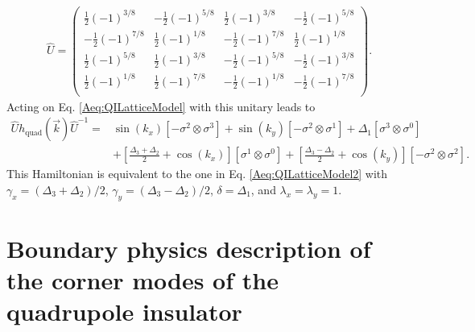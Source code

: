 \documentclass[%
 reprint,
 amsmath,amssymb,
 aps,
]{revtex4-1}
\begin{document}
\begin{appendix}
\begin{equation}\begin{split}
\hat{U} = \left(
\begin{array}{cccc}
 \frac{1}{2} (-1)^{3/8} & -\frac{1}{2} (-1)^{5/8} & \frac{1}{2} (-1)^{3/8} & -\frac{1}{2}
   (-1)^{5/8} \\
 -\frac{1}{2} (-1)^{7/8} & \frac{1}{2} (-1)^{1/8} & -\frac{1}{2} (-1)^{7/8} &
   \frac{1}{2} (-1)^{1/8} \\
 \frac{1}{2} (-1)^{5/8} & \frac{1}{2} (-1)^{3/8} & -\frac{1}{2} (-1)^{5/8} & -\frac{1}{2}
   (-1)^{3/8} \\
 \frac{1}{2} (-1)^{1/8} & \frac{1}{2} (-1)^{7/8} & -\frac{1}{2} (-1)^{1/8} & -\frac{1}{2}
   (-1)^{7/8} \\
\end{array}
\right).
\label{Aeq:UnitaryBasisChange}\end{split}\end{equation}
Acting on Eq. \ref{Aeq:QILatticeModel} with this unitary leads to 
\begin{equation}\begin{split}
\hat{U}h_{\text{quad}}(\vec{k})\hat{U}^{-1} = &\sin(k_x)[-\sigma^2 \otimes \sigma^3]  + \sin(k_y)[-\sigma^2 \otimes \sigma^1] + \Delta_1 [\sigma^3 \otimes \sigma^0]\\
&+[\frac{\Delta_3 + \Delta_2}{2} + \cos(k_x)][\sigma^1 \otimes \sigma^0] +[\frac{\Delta_3 - \Delta_2}{2} + \cos(k_y)][-\sigma^2\otimes \sigma^2].
\label{Aeq:QILatticeModelTrans}\end{split}\end{equation}
This Hamiltonian is equivalent to the one in Eq. \ref{Aeq:QILatticeModel2} with $\gamma_x = (\Delta_3+\Delta_2)/2$, $\gamma_y = (\Delta_3-\Delta_2)/2$, $\delta = \Delta_1$, and $\lambda_x = \lambda_y = 1$. 





\section{Boundary physics description of the corner modes of the quadrupole insulator}\label{app:QIBound}


\end{appendix}
\end{document}
